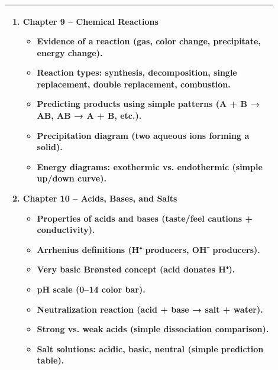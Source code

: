 \documentclass{article}
\begin{document}
\begin{tabular}{|p{0.9\linewidth}|}
\begin{enumerate}
    \item \textbf{Chapter 9 – Chemical Reactions}
    \begin{itemize}
        \item Evidence of a reaction (gas, color change, precipitate, energy change).
        \item Reaction types: synthesis, decomposition, single replacement, double replacement, combustion.
        \item Predicting products using simple patterns (A + B → AB, AB → A + B, etc.).
        \item Precipitation diagram (two aqueous ions forming a solid).
        \item Energy diagrams: exothermic vs. endothermic (simple up/down curve).
    \end{itemize}

    \item \textbf{Chapter 10 – Acids, Bases, and Salts}
    \begin{itemize}
        \item Properties of acids and bases (taste/feel cautions + conductivity).
        \item Arrhenius definitions (H⁺ producers, OH⁻ producers).
        \item Very basic Brønsted concept (acid donates H⁺).
        \item pH scale (0–14 color bar).
        \item Neutralization reaction (acid + base → salt + water).
        \item Strong vs. weak acids (simple dissociation comparison).
        \item Salt solutions: acidic, basic, neutral (simple prediction table).
    \end{itemize}

\end{enumerate} \\
\hline
\end{tabular}
\end{document}
